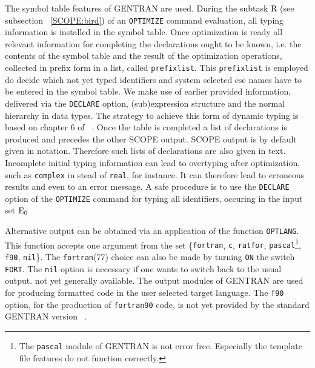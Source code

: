 The symbol table features of GENTRAN are used. During the subtask
R (see subsection ~\ref{SCOPE:bird}) of an {\tt OPTIMIZE} command evaluation, 
all typing information is installed in the symbol table. Once optimization
is ready all relevant information for completing the declarations ought to
be known, i.e. the contents of the symbol table and the result of the
optimization operations, collected in prefix form in a list, 
called {\tt prefixlist}. This {\tt prefixlist} is employed do decide which not yet typed identifiers and system selected cse names have to be entered in the
symbol table. We make use of earlier provided information, delivered via the
{\tt DECLARE} option, (sub)expression structure and the normal hierarchy in data
types. The strategy to achieve this form of dynamic typing is based on 
chapter 6 of ~\cite{Aho:86}.
Once the table is completed a list of declarations is produced and precedes the
other SCOPE output. SCOPE output is by default given in {\REDUCE} notation.
Therefore such lists of declarations are also given in {\REDUCE} text.
Incomplete initial typing information can lead to overtyping after 
optimization, such as {\tt complex} in stead of {\tt real}, for instance. 
It can therefore lead to erroneous results and even to an error message. 
A safe procedure is to
use the {\tt DECLARE} option of the {\tt OPTIMIZE} command for typing
all identifiers, occuring in the input set ${\rm E}_0$

Alternative output can be obtained via an application of the function 
{\tt OPTLANG}. This function accepts one argument from the set \{{\tt fortran},
{\tt c}, {\tt ratfor}, {\tt pascal}\footnote{The {\tt pascal} module of
GENTRAN is not error free. Especially the template file features do not
function correctly.}, {\tt f90}, {\tt nil}\}.
The {\tt fortran}(77) choice can also be made by turning {\tt ON} the 
switch {\tt FORT}. The {\tt nil} option is necessary if one wants to
switch back to the usual {\REDUCE} output. 
not yet generally available. The output modules of GENTRAN are used for 
producing formatted code in the user selected target language. The
{\tt f90} option, for the production of {\tt fortran90} code, 
is not yet provided by the standard GENTRAN version ~\cite{Borst:94}.

